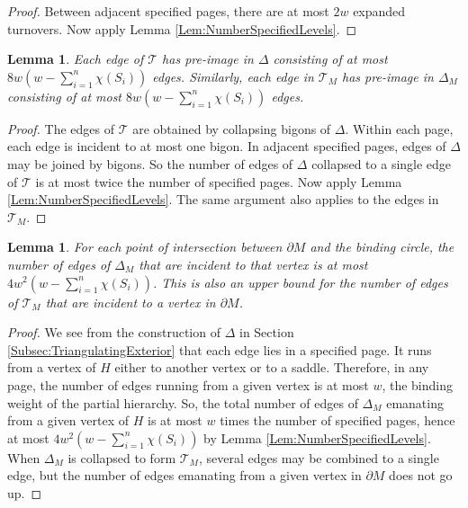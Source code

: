 \documentclass[oneside]{amsart}
\numberwithin{equation}{section}
\theoremstyle{plain}
\newtheorem{lemma}[equation]{Lemma}
\theoremstyle{definition}
\newcommand{\calT}{{\mathcal{T}}}
\begin{document}
\begin{proof}
Between adjacent specified pages, there are at most $2w$ expanded turnovers. Now apply
Lemma \ref{Lem:NumberSpecifiedLevels}.
\end{proof}

\begin{lemma} 
\label{Lem:NumberEdgePreimages}
Each edge of $\calT$ has pre-image in $\Delta$ consisting of at most $8w (w - \sum_{i=1}^n \chi(S_i))$
edges. Similarly, each edge in $\calT_M$ has pre-image in $\Delta_M$ consisting of at most $8w (w - \sum_{i=1}^n \chi(S_i))$
edges.
\end{lemma}

\begin{proof}
The edges of $\calT$ are obtained by collapsing bigons of $\Delta$. Within each page, each edge is incident to at most
one bigon. In adjacent specified pages,
edges of $\Delta$ may be joined by bigons. So the number of edges of $\Delta$ collapsed to a single edge of $\calT$
is at most twice the number of specified pages. Now apply Lemma \ref{Lem:NumberSpecifiedLevels}.
The same argument also applies to the edges in $\calT_M$.
\end{proof}

\begin{lemma}
\label{Lem:EdgesIncidentToVertex}
For each point of intersection between $\partial M$ and the binding circle, the number of edges of $\Delta_M$ that are incident to that vertex is at most $4w^2(w - \sum_{i=1}^n \chi(S_i))$.
This is also an upper bound for the number of edges of $\calT_M$ that are incident to a vertex in $\partial M$.
\end{lemma}
 
\begin{proof}
We see from the construction of $\Delta$ in Section \ref{Subsec:TriangulatingExterior} that each edge lies in a specified page. It runs from a vertex of $H$ either to another vertex or to a saddle. Therefore, in any page, the number of edges running from a given vertex is at most $w$, the binding weight of the partial hierarchy. So, the total number of edges of $\Delta_M$ emanating from a given vertex of $H$ is at most $w$ times the number of specified pages, hence at most $4w^2(w - \sum_{i=1}^n \chi(S_i))$ by Lemma \ref{Lem:NumberSpecifiedLevels}. When $\Delta_M$ is collapsed to form $\calT_M$, several edges may be combined to a single edge, but the number of edges emanating from a given vertex in $\partial M$ does not go up.
\end{proof}
\end{document}
